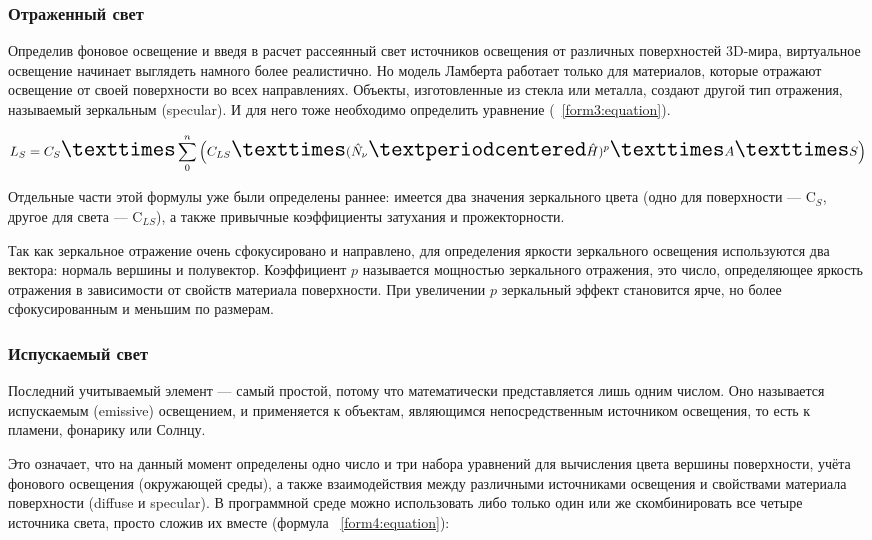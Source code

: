 \subsubsection{Отраженный свет}

Определив фоновое освещение и введя в расчет рассеянный свет источников освещения от различных поверхностей 3D-мира, виртуальное освещение начинает выглядеть намного более реалистично. Но модель Ламберта работает только для материалов, которые отражают освещение от своей поверхности во всех направлениях. Объекты, изготовленные из стекла или металла, создают другой тип отражения, называемый зеркальным (specular). И для него тоже необходимо определить уравнение (~\ref{form3:equation}).

\begin{equation}
	\fontsize{17}{20}{L_{S} = C_{S} × \sum_{0}^{n} \left(C_{LS} × (\hat{N}_{\nu} · \hat{H})^{p} × A × S\right)}
	\label{form3:equation}
\end{equation}

Отдельные части этой формулы уже были определены раннее: имеется два значения зеркального цвета (одно для поверхности — C$_{S}$, другое для света — C$_{LS}$), а также привычные коэффициенты затухания и прожекторности.

Так как зеркальное отражение очень сфокусировано и направлено, для определения яркости зеркального освещения используются два вектора: нормаль вершины и полувектор. Коэффициент $p$ называется мощностью зеркального отражения, это число, определяющее яркость отражения в зависимости от свойств материала поверхности. При увеличении $p$ зеркальный эффект становится ярче, но более сфокусированным и меньшим по размерам.

\subsubsection{Испускаемый свет}

Последний учитываемый элемент — самый простой, потому что математически представляется лишь одним числом. Оно называется испускаемым (emissive) освещением, и применяется к объектам, являющимся непосредственным источником освещения, то есть к пламени, фонарику или Солнцу.

Это означает, что на данный момент определены одно число и три набора уравнений для вычисления цвета вершины поверхности, учёта фонового освещения (окружающей среды), а также взаимодействия между различными источниками освещения и свойствами материала поверхности (diffuse и specular). В программной среде можно использовать либо только один или же скомбинировать все четыре источника света, просто сложив их вместе (формула ~\ref{form4:equation}):

